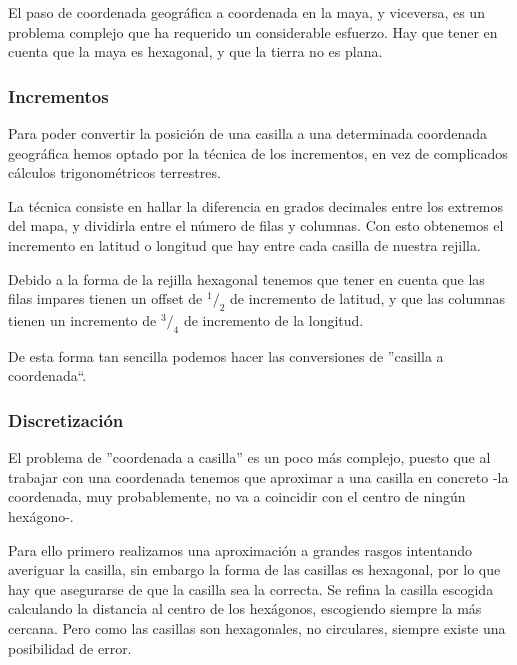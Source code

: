 El paso de coordenada geográfica a coordenada en la maya, y viceversa, es un
problema complejo que ha requerido un considerable esfuerzo. Hay que tener en
cuenta que la maya es hexagonal, y que la tierra no es plana.

\subsubsection{Incrementos} \label{incrementos}

Para poder convertir la posición de una casilla a una determinada coordenada
geográfica hemos optado por la técnica de los incrementos, en vez de complicados
cálculos trigonométricos terrestres.

La técnica consiste en hallar la diferencia en grados decimales entre los
extremos del mapa, y dividirla entre el número de filas y columnas. Con esto
obtenemos el incremento en latitud o longitud que hay entre cada casilla de
nuestra rejilla.

Debido a la forma de la rejilla hexagonal tenemos que tener en cuenta que las
filas impares tienen un offset de \begin{math}^1/_2\end{math} de incremento de
latitud, y que las columnas tienen un incremento de \begin{math}^3/_4\end{math}
de incremento de la longitud.

De esta forma tan sencilla podemos hacer las conversiones de ''casilla a
coordenada``.

\subsubsection{Discretización}

El problema de ''coordenada a casilla'' es un poco más complejo, puesto que al
trabajar con una coordenada tenemos que aproximar a una casilla en concreto
-la coordenada, muy probablemente, no va a coincidir con el centro de ningún
hexágono-.

Para ello primero realizamos una aproximación a grandes rasgos intentando
averiguar la casilla, sin embargo la forma de las casillas es hexagonal, por lo
que hay que asegurarse de que la casilla sea la correcta. Se refina la casilla
escogida calculando la distancia al centro de los hexágonos, escogiendo siempre
la más cercana. Pero como las casillas son hexagonales, no circulares, siempre
existe una posibilidad de error.

